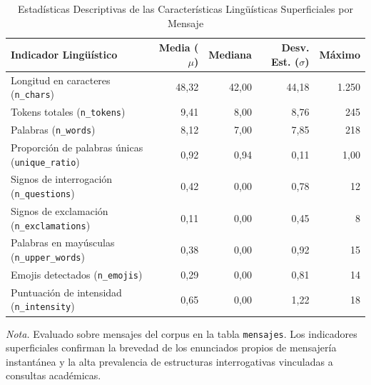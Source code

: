 \begin{table}[htbp]
  \centering
  \small
  \caption{Estadísticas Descriptivas de las Características Lingüísticas Superficiales por Mensaje}
  \label{tab:v2_features}
  \begin{tabular}{lrrrr}
    \toprule
    Indicador Lingüístico & Media ($\mu$) & Mediana & Desv. Est. ($\sigma$) & Máximo \\
    \midrule
    Longitud en caracteres (\texttt{n\_chars})        & 48,32 & 42,00 & 44,18 & 1.250 \\
    Tokens totales (\texttt{n\_tokens})              & 9,41  & 8,00  & 8,76  & 245   \\
    Palabras (\texttt{n\_words})                     & 8,12  & 7,00  & 7,85  & 218   \\
    Proporción de palabras únicas (\texttt{unique\_ratio}) & 0,92  & 0,94  & 0,11  & 1,00  \\
    Signos de interrogación (\texttt{n\_questions})  & 0,42  & 0,00  & 0,78  & 12    \\
    Signos de exclamación (\texttt{n\_exclamations}) & 0,11  & 0,00  & 0,45  & 8     \\
    Palabras en mayúsculas (\texttt{n\_upper\_words})& 0,38  & 0,00  & 0,92  & 15    \\
    Emojis detectados (\texttt{n\_emojis})           & 0,29  & 0,00  & 0,81  & 14    \\
    Puntuación de intensidad (\texttt{n\_intensity}) & 0,65  & 0,00  & 1,22  & 18    \\
    \bottomrule
  \end{tabular}
  \vspace{4pt}
  \begin{minipage}{0.92\textwidth}
    \footnotesize
    \textit{Nota.} Evaluado sobre \nMensajes{} mensajes del corpus en la tabla \texttt{mensajes}. Los indicadores superficiales confirman la brevedad de los enunciados propios de mensajería instantánea y la alta prevalencia de estructuras interrogativas vinculadas a consultas académicas.
  \end{minipage}
\end{table}
